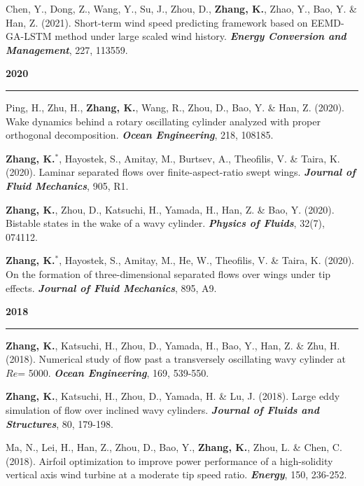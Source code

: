 \documentclass[10pt]{article}
\begin{document}
{\begin{etaremune}
  \item Chen, Y., Dong, Z., Wang, Y., Su, J., Zhou, D., \textbf{Zhang, K.}, Zhao, Y., Bao, Y. \& Han, Z. (2021). Short-term wind speed predicting framework based on EEMD-GA-LSTM method under large scaled wind history. \textit{\textbf{Energy Conversion and Management}}, 227, 113559.
  
 \item [] {\bf \color{Blue} 2020 \rule{14.8cm}{0.2mm}} 
 
  \item Ping, H., Zhu, H., \textbf{Zhang, K.}, Wang, R., Zhou, D., Bao, Y. \& Han, Z. (2020). Wake dynamics behind a rotary oscillating cylinder analyzed with proper orthogonal decomposition. \textit{\textbf{Ocean Engineering}}, 218, 108185.
  
  \item \textbf{Zhang, K.}$^*$, Hayostek, S., Amitay, M., Burtsev, A., Theofilis, V. \& Taira, K. (2020). Laminar separated flows over finite-aspect-ratio swept wings. \textit{\textbf{Journal of Fluid Mechanics}}, 905, R1.
  
  \item \textbf{Zhang, K.}, Zhou, D., Katsuchi, H., Yamada, H., Han, Z. \& Bao, Y. (2020). Bistable states in the wake of a wavy cylinder. \textit{\textbf{Physics of Fluids}}, 32(7), 074112.
  
  \item \textbf{Zhang, K.}$^*$, Hayostek, S., Amitay, M., He, W., Theofilis, V. \& Taira, K. (2020). On the formation of three-dimensional separated flows over wings under tip effects. \textit{\textbf{Journal of Fluid Mechanics}}, 895, A9.

 \item [] {\bf \color{Blue} 2018 \rule{14.8cm}{0.2mm}} 

  \item \textbf{Zhang, K.}, Katsuchi, H., Zhou, D., Yamada, H., Bao, Y., Han, Z. \& Zhu, H. (2018). Numerical study of flow past a transversely oscillating wavy cylinder at $Re$= 5000. \textit{\textbf{Ocean Engineering}}, 169, 539-550.
  
  \item \textbf{Zhang, K.}, Katsuchi, H., Zhou, D., Yamada, H. \& Lu, J. (2018). Large eddy simulation of flow over inclined wavy cylinders. \textit{\textbf{Journal of Fluids and Structures}}, 80, 179-198.
  
  \item Ma, N., Lei, H., Han, Z., Zhou, D., Bao, Y., \textbf{Zhang, K.}, Zhou, L. \& Chen, C. (2018). Airfoil optimization to improve power performance of a high-solidity vertical axis wind turbine at a moderate tip speed ratio. \textit{\textbf{Energy}}, 150, 236-252.
  

\end{etaremune}}
\end{document}
